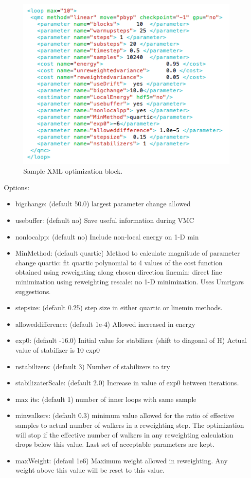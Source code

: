 \begin{figure}[ht!]
\begin{center}
\includegraphics[trim = 0mm 0mm 0mm 0mm, clip,width=0.70\columnwidth]{./figures/lab_advanced_molecules_xml_opt}
\end{center}
\caption{Sample XML optimization block.
\label{fig:lam_xml_opt}
}
\end{figure}

Options:
\begin{itemize}
  \item{bigchange: (default 50.0) largest parameter change allowed}
  \item{usebuffer: (default no) Save useful information during VMC}
  \item{nonlocalpp: (default no) Include non-local energy on 1-D min}
  \item{MinMethod: (default quartic) Method to calculate magnitude of parameter change
quartic: fit quartic polynomial to 4 values of the cost function obtained using reweighting 
along chosen direction linemin: direct line minimization using reweighting rescale:
no 1-D minimization. Uses Umrigars suggestions.}
  \item{stepsize: (default 0.25) step size in either quartic or linemin methods.}
  \item{alloweddifference: (default 1e-4) Allowed increased in energy}
  \item{exp0: (default -16.0) Initial value for stabilizer (shift to diagonal of H) Actual value
of stabilizer is 10 exp0}
  \item{nstabilizers: (default 3) Number of stabilizers to try}
  \item{stabilizaterScale: (default 2.0) Increase in value of exp0 between iterations.}
  \item{max its: (default 1) number of inner loops with same sample}
  \item{minwalkers: (default 0.3) minimum value allowed for the ratio of effective samples
to actual number of walkers in a reweighting step. The optimization will stop if the
effective number of walkers in any reweighting calculation drops below this value. Last
set of acceptable parameters are kept.}
  \item{maxWeight: (defaul 1e6) Maximum weight allowed in reweighting. Any weight above
this value will be reset to this value.}
\end{itemize}

